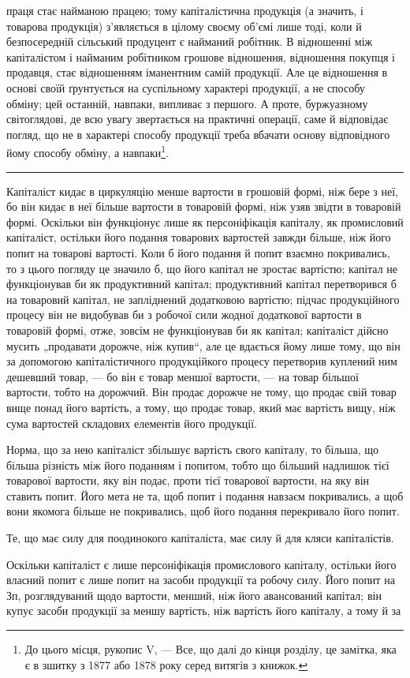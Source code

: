 \parcont{}  %
праця стає найманою працею; тому капіталістична продукція (а значить,
і товарова продукція) з’являється в цілому своєму об’ємі лише тоді,
коли й безпосередній сільський продуцент є найманий робітник. В відношенні
між капіталістом і найманим робітником грошове відношення, відношення покупця і продавця, стає
відношенням іманентним самій продукції. Але це відношення в основі своїй ґрунтується на суспільному
характері продукції, а не способу обміну; цей останній, навпаки, випливає з першого.
А проте, буржуазному світоглядові, де всю увагу звертається на практичні
операції, саме й відповідає погляд, що не в характері способу продукції
треба вбачати основу відповідного йому способу обміну, а навпаки\footnote{
До цього місця, рукопис V, — Все, що далі до кінця розділу, це замітка, яка є в зшитку з 1877 або
1878 року серед витягів з книжок.
}.

\pfbreak{}

\label{original-76}
Капіталіст кидає в циркуляцію менше вартости в грошовій формі,
ніж бере з неї, бо він кидає в неї більше вартости в товаровій формі,
ніж узяв звідти в товаровій формі. Оскільки він функціонує лише як персоніфікація
капіталу, як промисловий капіталіст, остільки його подання
товарових вартостей завжди більше, ніж його попит на товарові вартості.
Коли б його подання й попит взаємно покривались, то з цього погляду
це значило б, що його капітал не зростає вартістю; капітал не функціонував
би як продуктивний капітал; продуктивний капітал перетворився б
на товаровий капітал, не запліднений додатковою вартістю; підчас продукційного
процесу він не видобував би з робочої сили жодної додаткової
вартости в товаровій формі, отже, зовсім не функціонував би як
капітал; капіталіст дійсно мусить „продавати дорожче, ніж купив“, але
це вдається йому лише тому, що він за допомогою капіталістичного
продукційкого процесу перетворив куплений ним дешевший товар, — бо він
є товар меншої вартости, — на товар більшої вартости, тобто на дорожчий.
Він продає дорожче не тому, що продає свій товар вище понад його
вартість, а тому, що продає товар, який має вартість вищу, ніж сума
вартостей складових елементів його продукції.

Норма, що за нею капіталіст збільшує вартість свого капіталу, то більша,
що більша різність між його поданням і попитом, тобто що більший
надлишок тієї товарової вартости, яку він подає, проти тієї товарової
вартости, на яку він ставить попит. Його мета не та, щоб попит і
подання навзаєм покривались, а щоб вони якомога більше не покривались,
щоб його подання перекривало його попит.

Те, що має силу для поодинокого капіталіста, має силу й для кляси
капіталістів.

Оскільки капіталіст є лише персоніфікація промислового капіталу,
остільки його власний попит є лише попит на засоби продукції та
робочу силу. Його попит на $Зп$, розглядуваний щодо вартости,
менший, ніж його авансований капітал; він купує засоби продукції
за меншу вартість, ніж вартість його капіталу, а тому й за
\parbreak{}  %
